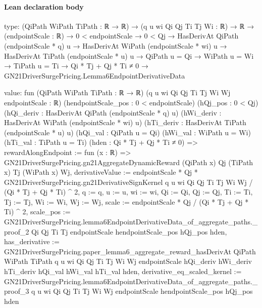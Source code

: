 \documentclass[10pt]{article}
\begin{document}
\paragraph{Lean declaration body}
\begin{ReviewVerbatim}
type:
(QiPath WiPath TiPath : ℝ → ℝ) →
  (q u wi Qi Qj Ti Tj Wi : ℝ) →
    ℝ →
      (endpointScale : ℝ) →
        0 < endpointScale →
          0 < Qj →
            HasDerivAt QiPath (endpointScale * q) u →
              HasDerivAt WiPath (endpointScale * wi) u →
                HasDerivAt TiPath (endpointScale * u) u →
                  QiPath u = Qi →
                    WiPath u = Wi →
                      TiPath u = Ti → Qi * Tj + Qj * Ti ≠ 0 → GN21DriverSurgePricing.Lemma6EndpointDerivativeData

value:
fun (QiPath WiPath TiPath : ℝ → ℝ) (q u wi Qi Qj Ti Tj Wi Wj endpointScale : ℝ) (hendpointScale_pos : 0 < endpointScale)
    (hQj_pos : 0 < Qj) (hQi_deriv : HasDerivAt QiPath (endpointScale * q) u)
    (hWi_deriv : HasDerivAt WiPath (endpointScale * wi) u) (hTi_deriv : HasDerivAt TiPath (endpointScale * u) u)
    (hQi_val : QiPath u = Qi) (hWi_val : WiPath u = Wi) (hTi_val : TiPath u = Ti) (hden : Qi * Tj + Qj * Ti ≠ 0) =>
  {
    rewardAlongEndpoint := fun (x : ℝ) =>
      GN21DriverSurgePricing.gn21AggregateDynamicReward (QiPath x) Qj (TiPath x) Tj (WiPath x) Wj,
    derivativeValue :=
      endpointScale * Qj * GN21DriverSurgePricing.gn21DerivativeSignKernel q u wi Qi Qj Ti Tj Wi Wj /
        (Qi * Tj + Qj * Ti) ^ 2,
    q := q, u := u, wi := wi, Qi := Qi, Qj := Qj, Ti := Ti, Tj := Tj, Wi := Wi, Wj := Wj,
    scale := endpointScale * Qj / (Qi * Tj + Qj * Ti) ^ 2,
    scale_pos :=
      GN21DriverSurgePricing.lemma6EndpointDerivativeData_of_aggregate_paths._proof_2 Qi Qj Ti Tj endpointScale
        hendpointScale_pos hQj_pos hden,
    has_derivative :=
      GN21DriverSurgePricing.paper_lemma6_aggregate_reward_hasDerivAt QiPath WiPath TiPath q u wi Qi Qj Ti Tj Wi Wj
        endpointScale hQi_deriv hWi_deriv hTi_deriv hQi_val hWi_val hTi_val hden,
    derivative_eq_scaled_kernel :=
      GN21DriverSurgePricing.lemma6EndpointDerivativeData_of_aggregate_paths._proof_3 q u wi Qi Qj Ti Tj Wi Wj
        endpointScale hendpointScale_pos hQj_pos hden }
\end{ReviewVerbatim}
\end{document}
